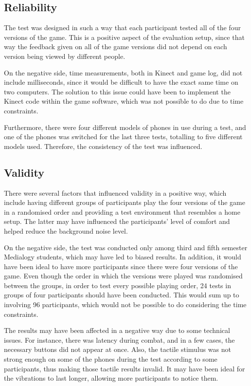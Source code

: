 \subsection{Reliability}
The test was designed in such a way that each participant tested all of the four versions of the game. This is a positive aspect of the evaluation setup, since that way the feedback given on all of the game versions did not depend on each version being viewed by different people.

On the negative side, time measurements, both in Kinect and game log, did not include milliseconds, since it would be difficult to have the exact same time on two computers. The solution to this issue could have been to implement the Kinect code within the game software, which was not possible to do due to time constraints.

Furthermore, there were four different models of phones in use during a test, and one of the phones was switched for the last three tests, totalling to five different models used. Therefore, the consistency of the test was influenced.

\subsection{Validity}
There were several factors that influenced validity in a positive way, which include having different groups of participants play the four versions of the game in a randomised order and providing a test environment that resembles a home setup. The latter may have influenced the participants’ level of comfort and helped reduce the background noise level. 

On the negative side, the test was conducted only among third and fifth semester Medialogy students, which may have led to biased results. In addition, it would have been ideal to have more participants since there were four versions of the game. Even though the order in which the versions were played was randomised between the groups, in order to test every possible playing order, 24 tests in groups of four participants should have been conducted. This would sum up to involving 96 participants, which would not be possible to do considering the time constraints.

The results may have been affected in a negative way due to some technical issues. For instance, there was latency during combat, and in a few cases, the necessary buttons did not appear at once. Also, the tactile stimulus was not strong enough on some of the phones during the test according to some participants, thus making those tactile results invalid. It may have been ideal for the vibrations to last longer, allowing more participants to notice them.

